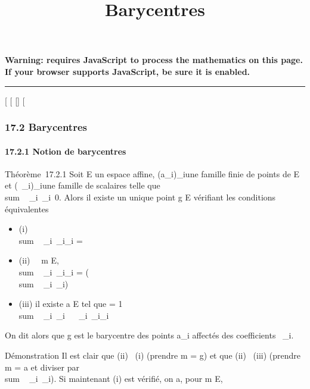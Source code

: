 \documentclass[]{article}
\title{Barycentres}
\author{}
\date{}
\begin{document}
\maketitle

\textbf{Warning: 
requires JavaScript to process the mathematics on this page.\\ If your
browser supports JavaScript, be sure it is enabled.}

\begin{center}\rule{3in}{0.4pt}\end{center}

{[}
{[}
{[}{]}
{[}

\subsubsection{17.2 Barycentres}

\paragraph{17.2.1 Notion de barycentres}

Théorème~17.2.1 Soit E un espace affine, (a\_i)\_i\inI une
famille finie de points de E et (\lambda~\_i)\_i\inI une famille
de scalaires telle que
\\sum ~
\_i\inI\lambda~\_i\neq~0. Alors il existe un
unique point g \in E vérifiant les conditions équivalentes

\begin{itemize}
\itemsep1pt\parskip0pt
\item
  (i) \\sum ~
  \_i\inI\lambda~\_i\overrightarrowga\_i
  =
\item
  (ii) \forall~~m \in E,
  \\sum ~
  \_i\inI\lambda~\_i\overrightarrowma\_i
  = (\\sum ~
  \_i\inI\lambda~\_i)\overrightarrowmg
\item
  (iii) il existe a \in E tel que \overrightarrowag =
  1 \over
  \\sum ~
  \_i\inI\lambda~\_i \
  \sum ~
  \_i\inI\lambda~\_i\overrightarrowaa\_i
\end{itemize}

On dit alors que g est le barycentre des points a\_i affectés
des coefficients \lambda~\_i.

Démonstration Il est clair que (ii) \rigtharrow~(i) (prendre m = g) et que (ii)
\rigtharrow~(iii) (prendre m = a et diviser par
\\sum ~
\_i\inI\lambda~\_i). Si maintenant (i) est vérifié, on a, pour m \in
E,
\end{document}
